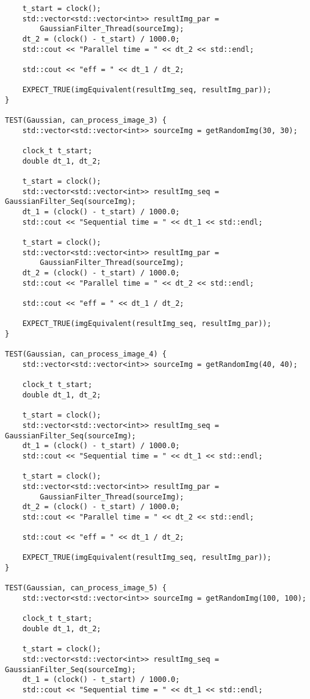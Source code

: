 \documentclass{report}
\begin{document}
\begin{lstlisting}
    t_start = clock();
    std::vector<std::vector<int>> resultImg_par =
        GaussianFilter_Thread(sourceImg);
    dt_2 = (clock() - t_start) / 1000.0;
    std::cout << "Parallel time = " << dt_2 << std::endl;

    std::cout << "eff = " << dt_1 / dt_2;

    EXPECT_TRUE(imgEquivalent(resultImg_seq, resultImg_par));
}

TEST(Gaussian, can_process_image_3) {
    std::vector<std::vector<int>> sourceImg = getRandomImg(30, 30);

    clock_t t_start;
    double dt_1, dt_2;

    t_start = clock();
    std::vector<std::vector<int>> resultImg_seq = GaussianFilter_Seq(sourceImg);
    dt_1 = (clock() - t_start) / 1000.0;
    std::cout << "Sequential time = " << dt_1 << std::endl;

    t_start = clock();
    std::vector<std::vector<int>> resultImg_par =
        GaussianFilter_Thread(sourceImg);
    dt_2 = (clock() - t_start) / 1000.0;
    std::cout << "Parallel time = " << dt_2 << std::endl;

    std::cout << "eff = " << dt_1 / dt_2;

    EXPECT_TRUE(imgEquivalent(resultImg_seq, resultImg_par));
}

TEST(Gaussian, can_process_image_4) {
    std::vector<std::vector<int>> sourceImg = getRandomImg(40, 40);

    clock_t t_start;
    double dt_1, dt_2;

    t_start = clock();
    std::vector<std::vector<int>> resultImg_seq = GaussianFilter_Seq(sourceImg);
    dt_1 = (clock() - t_start) / 1000.0;
    std::cout << "Sequential time = " << dt_1 << std::endl;

    t_start = clock();
    std::vector<std::vector<int>> resultImg_par =
        GaussianFilter_Thread(sourceImg);
    dt_2 = (clock() - t_start) / 1000.0;
    std::cout << "Parallel time = " << dt_2 << std::endl;

    std::cout << "eff = " << dt_1 / dt_2;

    EXPECT_TRUE(imgEquivalent(resultImg_seq, resultImg_par));
}

TEST(Gaussian, can_process_image_5) {
    std::vector<std::vector<int>> sourceImg = getRandomImg(100, 100);

    clock_t t_start;
    double dt_1, dt_2;

    t_start = clock();
    std::vector<std::vector<int>> resultImg_seq = GaussianFilter_Seq(sourceImg);
    dt_1 = (clock() - t_start) / 1000.0;
    std::cout << "Sequential time = " << dt_1 << std::endl;


\end{lstlisting}
\end{document}
